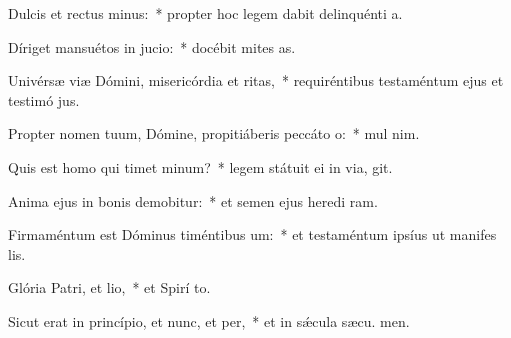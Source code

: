 \item Dulcis et rectus minus:~* propter hoc legem dabit delinquénti  a.
\item Díriget mansuétos in jucio:~* docébit mites  as.
\item Univérsæ viæ Dómini, misericórdia et ritas,~* requiréntibus testaméntum ejus et testimó jus.
\item Propter nomen tuum, Dómine, propitiáberis peccáto o:~* mul  nim.
\item Quis est homo qui timet minum?~* legem státuit ei in via,  git.
\item Anima ejus in bonis demobitur:~* et semen ejus heredi ram.
\item Firmaméntum est Dóminus timéntibus um:~* et testaméntum ipsíus ut manifes lis.
\item Glória Patri, et lio,~* et Spirí to.
\item Sicut erat in princípio, et nunc, et per,~* et in sǽcula sæcu. men.
